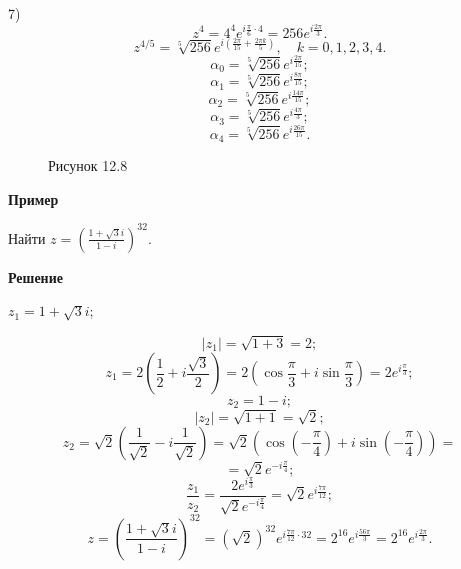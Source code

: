 \documentclass[12pt,a4paper]{article}
\begin{document}
7) $$z^4=4^4e^{i\frac{\pi}{6}\cdot4}=256e^{i\frac{2\pi}{3}}.$$
$$
z^{4/5}=\sqrt[5]{256}e^{i\left(\frac{2\pi}{15}+\frac{2\pi
k}{5}\right)},\quad k=0,1,2,3,4.
$$
$$
\alpha_0=\sqrt[5]{256}e^{i\frac{2\pi}{15}};
$$
$$
\alpha_1=\sqrt[5]{256}e^{i\frac{8\pi}{15}};
$$
$$
\alpha_2=\sqrt[5]{256}e^{i\frac{14\pi}{15}};
$$
$$
\alpha_3=\sqrt[5]{256}e^{i\frac{4\pi}{3}};
$$
$$
\alpha_4=\sqrt[5]{256}e^{i\frac{26\pi}{15}}.
$$

\begin{figure}[H]
\centering
{}
\caption*{Рисунок 12.8}
\end{figure}

\textbf{Пример}

Найти $z=\left(\frac{1+\sqrt3i}{1-i}\right)^{32}$.

\textbf{Решение}

$z_1=1+\sqrt3i$;

$$
|z_1|=\sqrt{1+3}=2;
$$
$$
z_1=2\left(\frac12+i\frac{\sqrt3}{2}\right)=2\left(\cos\frac{\pi}{3}+i\sin\frac{\pi}{3}\right)=2e^{i\frac{\pi}{3}};
$$
$$
z_2=1-i;
$$
$$
|z_2|=\sqrt{1+1}=\sqrt2;
$$
$$
z_2=\sqrt2\left(\frac{1}{\sqrt2}-i\frac{1}{\sqrt2}\right)=\sqrt2\left(\cos\left(-\frac{\pi}{4}\right)+i\sin\left(-\frac{\pi}{4}\right)\right)=
$$
$$
=\sqrt2e^{-i\frac{\pi}{4}};
$$
$$
\frac{z_1}{z_2}=\frac{2e^{i\frac{\pi}{3}}}{\sqrt2e^{-i\frac{\pi}{4}}}=\sqrt2e^{i\frac{7\pi}{12}};
$$
$$
z=\left(\frac{1+\sqrt3i}{1-i}\right)^{32}=(\sqrt2)^{32}e^{i\frac{7\pi}{12}\cdot32}=2^{16}e^{i\frac{56\pi}{3}}=2^{16}e^{i\frac{2\pi}{3}}.
$$
\end{document}
